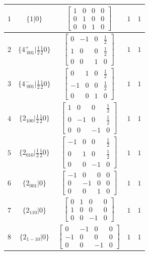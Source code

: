 \documentclass[fleqn,8pt]{jsarticle}
\begin{document}
\begin{longtable}{ccccc}
$ 1 $ & $ \{1|0\} $ & $ \begin{bmatrix} 1 & 0 & 0 & 0 \\ 0 & 1 & 0 & 0 \\ 0 & 0 & 1 & 0 \end{bmatrix} $ & $ 1 $ & $ 1 $ \\ \hline
$ 2 $ & $ \{4^{+}_{\,\,001}|\frac{1}{2} \frac{1}{2} 0\} $ & $ \begin{bmatrix} 0 & -1 & 0 & \frac{1}{2} \\ 1 & 0 & 0 & \frac{1}{2} \\ 0 & 0 & 1 & 0 \end{bmatrix} $ & $ 1 $ & $ 1 $ \\ \hline
$ 3 $ & $ \{4^{-}_{\,\,001}|\frac{1}{2} \frac{1}{2} 0\} $ & $ \begin{bmatrix} 0 & 1 & 0 & \frac{1}{2} \\ -1 & 0 & 0 & \frac{1}{2} \\ 0 & 0 & 1 & 0 \end{bmatrix} $ & $ 1 $ & $ 1 $ \\ \hline
$ 4 $ & $ \{2{}_{100}|\frac{1}{2} \frac{1}{2} 0\} $ & $ \begin{bmatrix} 1 & 0 & 0 & \frac{1}{2} \\ 0 & -1 & 0 & \frac{1}{2} \\ 0 & 0 & -1 & 0 \end{bmatrix} $ & $ 1 $ & $ 1 $ \\ \hline
$ 5 $ & $ \{2{}_{010}|\frac{1}{2} \frac{1}{2} 0\} $ & $ \begin{bmatrix} -1 & 0 & 0 & \frac{1}{2} \\ 0 & 1 & 0 & \frac{1}{2} \\ 0 & 0 & -1 & 0 \end{bmatrix} $ & $ 1 $ & $ 1 $ \\ \hline
$ 6 $ & $ \{2{}_{001}|0\} $ & $ \begin{bmatrix} -1 & 0 & 0 & 0 \\ 0 & -1 & 0 & 0 \\ 0 & 0 & 1 & 0 \end{bmatrix} $ & $ 1 $ & $ 1 $ \\ \hline
$ 7 $ & $ \{2{}_{110}|0\} $ & $ \begin{bmatrix} 0 & 1 & 0 & 0 \\ 1 & 0 & 0 & 0 \\ 0 & 0 & -1 & 0 \end{bmatrix} $ & $ 1 $ & $ 1 $ \\ \hline
$ 8 $ & $ \{2{}_{1-10}|0\} $ & $ \begin{bmatrix} 0 & -1 & 0 & 0 \\ -1 & 0 & 0 & 0 \\ 0 & 0 & -1 & 0 \end{bmatrix} $ & $ 1 $ & $ 1 $ \\ \hline

\end{longtable}
\end{document}
